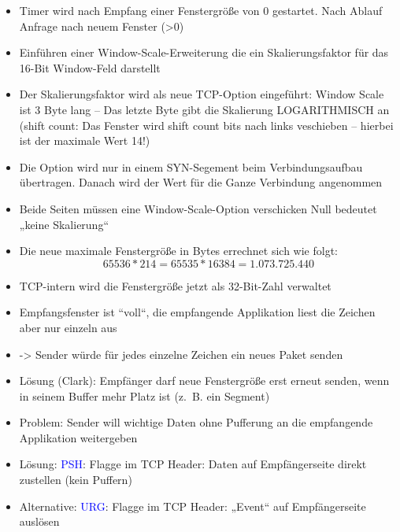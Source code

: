 \begin{itemize}
    \item Timer wird nach Empfang einer Fenstergröße von 0 gestartet.
    Nach Ablauf Anfrage nach neuem Fenster (>0)
\end{itemize}

\begin{itemize}
    \item Einführen einer Window-Scale-Erweiterung die ein Skalierungsfaktor für das 16-Bit Window-Feld darstellt
    \item Der Skalierungsfaktor wird als neue TCP-Option eingeführt: Window Scale ist 3 Byte lang – Das letzte Byte gibt die Skalierung LOGARITHMISCH an (shift count: Das Fenster wird shift count bits nach links veschieben – hierbei ist der maximale Wert 14!)
    \item Die Option wird nur in einem SYN-Segement beim Verbindungsaufbau übertragen.
    Danach wird der Wert für die Ganze Verbindung angenommen
    \item Beide Seiten müssen eine Window-Scale-Option verschicken Null bedeutet „keine Skalierung“
    \item Die neue maximale Fenstergröße in Bytes errechnet sich wie folgt: \[65536 * 214 = 65535 * 16384 = 1.073.725.440\]
    \item TCP-intern wird die Fenstergröße jetzt als 32-Bit-Zahl verwaltet
\end{itemize}

\begin{itemize}
    \item Empfangsfenster ist ``voll``, die empfangende Applikation liest die Zeichen aber nur einzeln aus
    \item -> Sender würde für jedes einzelne Zeichen ein neues Paket senden
    \item Lösung (Clark): Empfänger darf neue Fenstergröße erst erneut senden, wenn in seinem Buffer mehr Platz ist (z.\ B. ein Segment)
\end{itemize}

\begin{itemize}
    \item Problem: Sender will wichtige Daten ohne Pufferung an die empfangende Applikation weitergeben
    \item Lösung: \textcolor{blue}{PSH}: Flagge im TCP Header: Daten auf Empfängerseite direkt zustellen (kein Puffern)
    \item Alternative: \textcolor{blue}{URG}: Flagge im TCP Header: „Event“ auf Empfängerseite auslösen
\end{itemize}